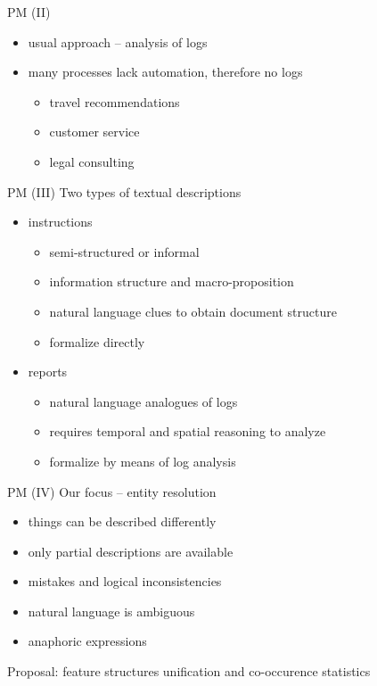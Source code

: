 \documentclass{beamer}
\begin{document}
\begin{frame}{PM (II)}
\begin{itemize}
    \item usual approach -- analysis of logs
    \item many processes lack automation, therefore no logs
        \begin{itemize}
            \item travel recommendations
            \item customer service
            \item legal consulting
        \end{itemize}
\end{itemize}
\end{frame}

\begin{frame}{PM (III)}
Two types of textual descriptions\\
\bigskip
\begin{itemize}
    \item instructions
        \begin{itemize}
            \item semi-structured or informal
            \item information structure and macro-proposition
            \item natural language clues to obtain document structure
            \item formalize directly
        \end{itemize}
    \item reports
        \begin{itemize}
            \item natural language analogues of logs
            \item requires temporal and spatial reasoning to analyze
            \item formalize by means of log analysis
        \end{itemize}
\end{itemize}
\end{frame}

\begin{frame}{PM (IV)}
Our focus -- entity resolution\\
\bigskip
\begin{itemize}
    \item things can be described differently
    \item only partial descriptions are available
    \item mistakes and logical inconsistencies
    \item natural language is ambiguous
    \item anaphoric expressions
\end{itemize}
\bigskip
Proposal: feature structures unification and co-occurence statistics
\end{frame}
\end{document}

